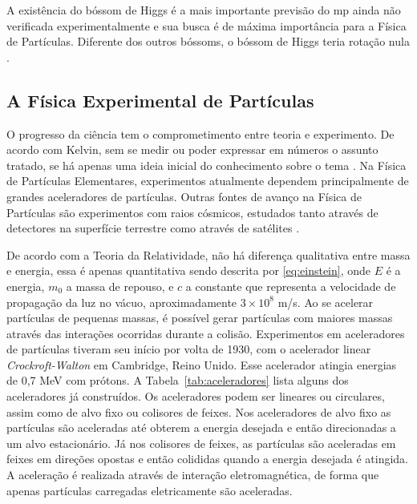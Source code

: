 A existência do bóssom de Higgs é a mais importante previsão do \gls{mp} 
ainda não verificada experimentalmente e sua busca é de máxima importância para
a Física de Partículas. Diferente dos outros bóssoms, o
bóssom de Higgs teria rotação nula \cite{Intro_Nuclear}.

\subsection{A Física Experimental de Partículas}
\label{ssec:fisexp}

O progresso da ciência tem o comprometimento entre teoria e experimento. De
acordo com Kelvin, sem se medir ou poder expressar em números o assunto tratado, 
se há apenas uma ideia inicial do conhecimento sobre o tema \cite{kelvin}. 
Na Física de Partículas Elementares, experimentos atualmente dependem
principalmente de grandes aceleradores de partículas. Outras fontes de avanço na
Física de Partículas são experimentos com raios cósmicos, estudados tanto
através de detectores na superfície terrestre como através de satélites 
\cite{nature_space_and_time}. 

De acordo com a Teoria da Relatividade, não há diferença qualitativa entre
massa e energia, essa é apenas quantitativa \cite{einstein} sendo descrita por
\ref{eq:einstein}, onde $E$ é a energia, $m_0$ a massa de repouso, e $c$ a constante que representa a
velocidade de propagação da luz no vácuo, aproximadamente $3\times10^{8}$ m/s. Ao se acelerar
partículas de pequenas massas, é possível gerar partículas com maiores massas
através das interações ocorridas durante a colisão. Experimentos em
aceleradores de partículas tiveram seu início por volta de 1930, com o
acelerador linear \emph{Crockroft-Walton} em Cambridge, Reino Unido. Esse
acelerador atingia energias de 0,7 MeV com prótons. A Tabela~\ref{tab:aceleradores} 
lista alguns dos aceleradores já construídos. Os
aceleradores podem ser lineares ou circulares, assim como de alvo fixo ou colisores
de feixes. Nos aceleradores de alvo fixo as partículas são aceleradas até
obterem a energia desejada e então direcionadas a um alvo estacionário. Já nos
colisores de feixes, as partículas são aceleradas em feixes em direções
opostas e então colididas quando a energia desejada é atingida. A aceleração é
realizada através de interação eletromagnética, de forma que apenas
partículas carregadas eletricamente são aceleradas.


